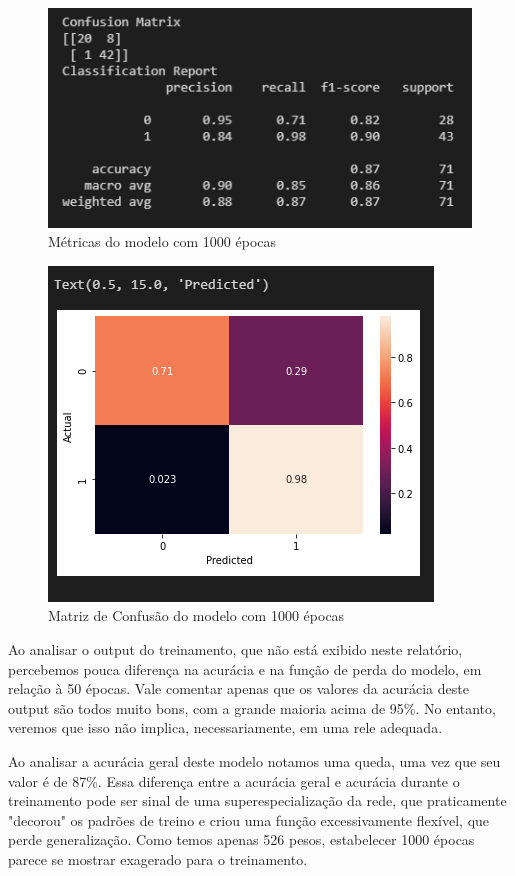 \documentclass[12pt]{article}
\begin{document}
\begin{figure}[H]
	\centering
	\includegraphics[width=0.7\linewidth]{Imagens/1000epocas/metricas1000epocas}
	\caption{Métricas do modelo com 1000 épocas}
	\label{fig:metricas1000epocas}
\end{figure}
\begin{figure}[H]
	\centering
	\includegraphics[width=0.7\linewidth]{Imagens/1000epocas/confusao1000epocas}
	\caption{Matriz de Confusão do modelo com 1000 épocas}
	\label{fig:confusao1000epocas}
\end{figure}

Ao analisar o output do treinamento, que não está exibido neste relatório, percebemos pouca diferença na acurácia e na função de perda do modelo, em relação à 50 épocas. Vale comentar apenas que os valores da acurácia deste output são todos muito bons, com a grande maioria acima de 95\%. No entanto, veremos que isso não implica, necessariamente, em uma rele adequada.

Ao analisar a acurácia geral deste modelo notamos uma queda, uma vez que seu valor é de 87\%. Essa diferença entre a acurácia geral e acurácia durante o treinamento pode ser sinal de uma superespecialização da rede, que praticamente "decorou" os padrões de treino e criou uma função excessivamente flexível, que perde generalização. Como temos apenas 526 pesos, estabelecer 1000 épocas parece se mostrar exagerado para o treinamento.
\end{document}
